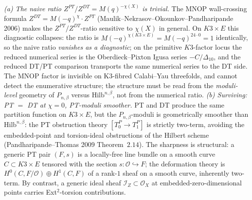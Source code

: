 \begin{remark}[PT/DT at \texorpdfstring{$\chi = 0$}{chi = 0}: naive-ratio killed, cosection-reduction surviving, K3-fibre hidden-pattern]
\label{rem:k3e-cy3-pt-cosection}
\emph{(a) The naive ratio $Z^{PT}/Z^{DT} = M(q)^{-\chi(X)}$ is trivial.} The MNOP wall-crossing formula $Z^{DT} = M(-q)^{\chi}\cdot Z^{PT}$ \textup{(}Maulik--Nekrasov--Okounkov--Pandharipande 2006\textup{)} makes the $Z^{PT}/Z^{DT}$-ratio sensitive to $\chi(X)$ in general. On $K3\times E$ this diagnostic collapses: the ratio is $M(-q)^{\chi(K3\times E)} = M(-q)^{24\cdot 0} = 1$ identically, so the naive ratio \emph{vanishes as a diagnostic}; on the primitive \(K3\)-factor locus the reduced numerical series is the Oberdieck--Pixton Igusa series \(-C/\Delta_{10}\), and the reduced DT/PT comparison transports the same numerical series to the DT side. The MNOP factor is invisible on K3-fibred Calabi--Yau threefolds, and cannot detect the enumerative structure; the structure must be read from the \emph{moduli-level} geometry of $P_{n,\beta}$ versus $\mathrm{Hilb}^{n,\beta}$, not from the numerical ratio.
\emph{(b) Surviving: PT $=$ DT at $\chi = 0$, PT-moduli smoother.} PT and DT produce the same partition function on $K3\times E$, but the $P_{n,\beta}$-moduli is geometrically smoother than $\mathrm{Hilb}^{n,\beta}$: the PT obstruction theory $[T^P_0\to T^P_1]$ is strictly two-term, avoiding the embedded-point and torsion-ideal obstructions of the Hilbert scheme \textup{(}Pandharipande--Thomas 2009 Theorem~$2.14$\textup{)}. The sharpness is structural: a generic PT pair $(F, s)$ is a locally-free line bundle on a smooth curve $C\subset K3\times E$ tensored with the section $s\colon\mathcal O\hookrightarrow F$; the deformation theory is $H^0(C, F/\mathcal O)\oplus H^1(C, F)$ of a rank-$1$ sheaf on a smooth curve, inherently two-term. By contrast, a generic ideal sheaf $\mathcal I_Z\subset\mathcal O_X$ at embedded-zero-dimensional points carries Ext${}^2$-torsion contributions.

\end{remark}
